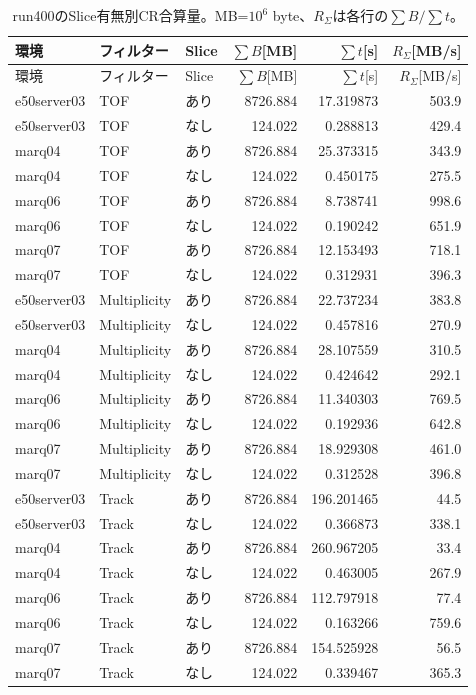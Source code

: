 \begingroup\small\begin{longtable}{lllrrr}
\caption{run400のSlice有無別CR合算量。MB=$10^6$ byte、$R_\Sigma$は各行の$\sum B/\sum t$。}\\
\hline 環境 & フィルター & Slice & $\sum B$[MB] & $\sum t$[s] & $R_\Sigma$[MB/s] \\\hline\endfirsthead
\hline 環境 & フィルター & Slice & $\sum B$[MB] & $\sum t$[s] & $R_\Sigma$[MB/s] \\\hline\endhead
e50server03 & TOF & あり & 8726.884 & 17.319873 & 503.9 \\
e50server03 & TOF & なし & 124.022 & 0.288813 & 429.4 \\
marq04 & TOF & あり & 8726.884 & 25.373315 & 343.9 \\
marq04 & TOF & なし & 124.022 & 0.450175 & 275.5 \\
marq06 & TOF & あり & 8726.884 & 8.738741 & 998.6 \\
marq06 & TOF & なし & 124.022 & 0.190242 & 651.9 \\
marq07 & TOF & あり & 8726.884 & 12.153493 & 718.1 \\
marq07 & TOF & なし & 124.022 & 0.312931 & 396.3 \\
e50server03 & Multiplicity & あり & 8726.884 & 22.737234 & 383.8 \\
e50server03 & Multiplicity & なし & 124.022 & 0.457816 & 270.9 \\
marq04 & Multiplicity & あり & 8726.884 & 28.107559 & 310.5 \\
marq04 & Multiplicity & なし & 124.022 & 0.424642 & 292.1 \\
marq06 & Multiplicity & あり & 8726.884 & 11.340303 & 769.5 \\
marq06 & Multiplicity & なし & 124.022 & 0.192936 & 642.8 \\
marq07 & Multiplicity & あり & 8726.884 & 18.929308 & 461.0 \\
marq07 & Multiplicity & なし & 124.022 & 0.312528 & 396.8 \\
e50server03 & Track & あり & 8726.884 & 196.201465 & 44.5 \\
e50server03 & Track & なし & 124.022 & 0.366873 & 338.1 \\
marq04 & Track & あり & 8726.884 & 260.967205 & 33.4 \\
marq04 & Track & なし & 124.022 & 0.463005 & 267.9 \\
marq06 & Track & あり & 8726.884 & 112.797918 & 77.4 \\
marq06 & Track & なし & 124.022 & 0.163266 & 759.6 \\
marq07 & Track & あり & 8726.884 & 154.525928 & 56.5 \\
marq07 & Track & なし & 124.022 & 0.339467 & 365.3 \\
\hline\end{longtable}\endgroup
